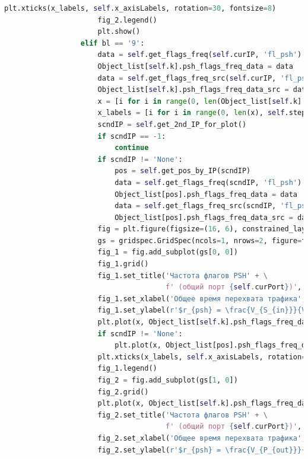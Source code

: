 \documentclass[bachelor, och, coursework]{SCWorks}
\begin{document}
\begin{lstlisting}[language=Python]
                      plt.xticks(x_labels, self.x_axisLabels, rotation=30, fontsize=8)
                      fig_2.legend()
                      plt.show()
                  elif bl == '9':
                      data = self.get_flags_freq(self.curIP, 'fl_psh')
                      Object_list[self.k].psh_flags_freq_data = data
                      data = self.get_flags_freq_src(self.curIP, 'fl_psh')
                      Object_list[self.k].psh_flags_freq_data_src = data
                      x = [i for i in range(0, len(Object_list[self.k].psh_flags_freq_data))]
                      x_labels = [i for i in range(0, len(x), self.step)]
                      scndIP = self.get_2nd_IP_for_plot()
                      if scndIP == -1:
                          continue
                      if scndIP != 'None':
                          pos = self.get_pos_by_IP(scndIP)
                          data = self.get_flags_freq(scndIP, 'fl_psh')
                          Object_list[pos].psh_flags_freq_data = data
                          data = self.get_flags_freq_src(scndIP, 'fl_psh')
                          Object_list[pos].psh_flags_freq_data_src = data
                      fig = plt.figure(figsize=(16, 6), constrained_layout=True)
                      gs = gridspec.GridSpec(ncols=1, nrows=2, figure=fig)
                      fig_1 = fig.add_subplot(gs[0, 0])
                      fig_1.grid()
                      fig_1.set_title('Частота флагов PSH' + \
                                      f' (общий порт {self.curPort})', fontsize=15 )
                      fig_1.set_xlabel('Общее время перехвата трафика', fontsize=15)
                      fig_1.set_ylabel(r'$r_{psh} = \frac{V_{S_{in}}}{V_{tcp}}$', fontsize=15)
                      plt.plot(x, Object_list[self.k].psh_flags_freq_data, 'b', label=self.curIP)
                      if scndIP != 'None':
                          plt.plot(x, Object_list[pos].psh_flags_freq_data, 'r', label=scndIP)
                      plt.xticks(x_labels, self.x_axisLabels, rotation=30, fontsize=8)
                      fig_1.legend()
                      fig_2 = fig.add_subplot(gs[1, 0])
                      fig_2.grid()
                      plt.plot(x, Object_list[self.k].psh_flags_freq_data_src, 'orange', label=self.curIP)
                      fig_2.set_title('Частота флагов PSH' + \
                                      f' (общий порт {self.curPort})', fontsize=15 )
                      fig_2.set_xlabel('Общее время перехвата трафика', fontsize=15)
                      fig_2.set_ylabel(r'$r_{psh} = \frac{V_{P_{out}}}{V_{tcp}}$', fontsize=15)

\end{lstlisting}
\end{document}
